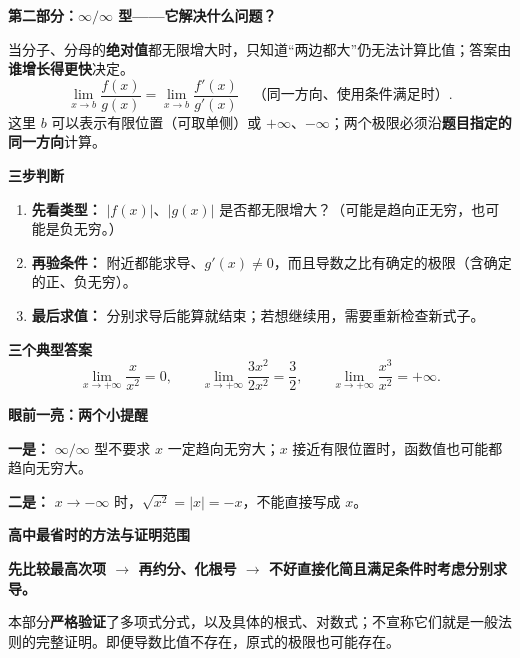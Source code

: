\clearpage
\begin{summarybox}
\textbf{\textcolor{CSummary}{第二部分：$\infty/\infty$ 型——它解决什么问题？}}

当分子、分母的\textbf{绝对值}都无限增大时，只知道“两边都大”仍无法计算比值；答案由\textbf{谁增长得更快}决定。
\[
\boxed{\displaystyle
\lim_{x\to b}\frac{f(x)}{g(x)}=\lim_{x\to b}\frac{f'(x)}{g'(x)}
\quad\text{（同一方向、使用条件满足时）}.}
\]
这里 $b$ 可以表示有限位置（可取单侧）或 $+\infty$、$-\infty$；两个极限必须沿\textbf{题目指定的同一方向}计算。

\medskip
\textbf{\textcolor{CSummary}{三步判断}}
\begin{enumerate}[leftmargin=*, itemsep=0.3em, topsep=0.3em]
\item \textbf{先看类型：} $|f(x)|$、$|g(x)|$ 是否都无限增大？（可能是趋向正无穷，也可能是负无穷。）
\item \textbf{再验条件：} 附近都能求导、$g'(x)\ne0$，而且导数之比有确定的极限（含确定的正、负无穷）。
\item \textbf{最后求值：} 分别求导后能算就结束；若想继续用，需要重新检查新式子。
\end{enumerate}

\medskip
\textbf{\textcolor{CSummary}{三个典型答案}}
\[
\lim_{x\to+\infty}\frac{x}{x^2}=0,\qquad
\lim_{x\to+\infty}\frac{3x^2}{2x^2}=\frac32,\qquad
\lim_{x\to+\infty}\frac{x^3}{x^2}=+\infty.
\]

\medskip
\textbf{\textcolor{CSummary}{眼前一亮：两个小提醒}}

\textbf{一是：} $\infty/\infty$ 型不要求 $x$ 一定趋向无穷大；$x$ 接近有限位置时，函数值也可能都趋向无穷大。

\textbf{二是：} $x\to-\infty$ 时，$\sqrt{x^2}=|x|=-x$，不能直接写成 $x$。

\medskip
\textbf{\textcolor{CSummary}{高中最省时的方法与证明范围}}

\textbf{先比较最高次项 $\rightarrow$ 再约分、化根号 $\rightarrow$ 不好直接化简且满足条件时考虑分别求导。}

本部分\textbf{严格验证}了多项式分式，以及具体的根式、对数式；不宣称它们就是一般法则的完整证明。即便导数比值不存在，原式的极限也可能存在。
\end{summarybox}
